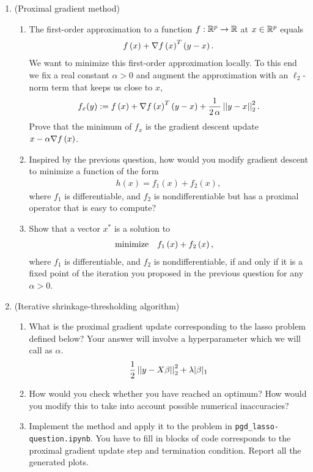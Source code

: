 \documentclass[12pt,twoside]{article}
\begin{document}
\begin{enumerate}
 
  \item (Proximal gradient method)   
 \begin{enumerate}
 \item The first-order approximation to a function $f:\mathbb{R}^{p}\rightarrow \mathbb{R}$ at $x \in \mathbb{R}^{p}$ equals
 \begin{align}
f\left( x \right) + \nabla f\left( x \right)^T\left( y-x \right). 
\end{align}
We want to minimize this first-order approximation locally. To this end we fix a real constant $\alpha >0$ and augment the approximation with an $\ell_2$-norm term that keeps us close to $x$,
 \begin{align}
f_{x}(y) :=f\left( x \right) + \nabla f\left( x \right)^T\left( y-x \right) +  \frac{1}{2 \, \alpha }\left|\left| y-x \right|\right| _{2}^2.
\end{align}
 Prove that the minimum of $f_{x}$ is the gradient descent update $x- \alpha \nabla f\left( x \right)$.
\item 
Inspired by the previous question, how would you modify gradient descent to minimize a function of the form
\begin{align}
h(x) = f_1(x) + f_2(x),
\end{align}
where $f_1$ is differentiable, and $f_2$ is nondifferentiable but has a proximal operator that is easy to compute?
\item Show that a vector $x^{\ast}$ is a solution to
\begin{align}
 \operatorname{minimize} \quad & f_1\left( x \right) + f_2\left( x \right),
\end{align}
where $f_1$ is differentiable, and $f_2$ is nondifferentiable, if and only if it is a fixed point of the iteration you proposed in the previous question for any $\alpha > 0$.
  \end{enumerate}
  
  \item (Iterative shrinkage-thresholding algorithm)   
 \begin{enumerate}
 \item What is the proximal gradient update corresponding to the lasso problem defined below? Your answer will involve a hyperparameter which we will call as $\alpha$. 
 \begin{align*}
 \frac{1}{2} \left|\left| y - X\beta \right|\right| _{2}^2 + \lambda |\beta|_1
 \end{align*}
 \item How would you check whether you have reached an optimum? How would you modify this to take into account possible numerical inaccuracies?
 \item Implement the method and apply it to the problem in \texttt{pgd\_lasso-question.ipynb}. You have to fill in blocks of code corresponds to the proximal gradient update step and termination condition. Report all the generated plots.
 \end{enumerate}
 

 \end{enumerate}
\end{document}
